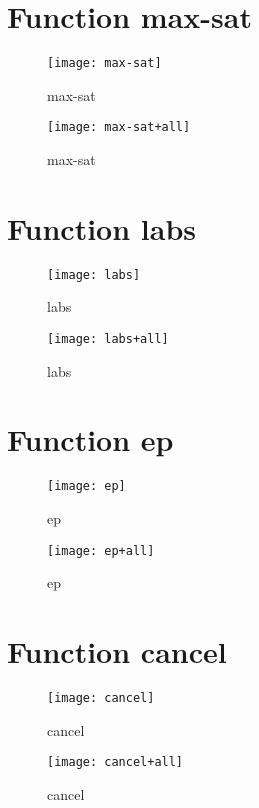 \section{Function max-sat}
\begin{center}

\end{center}
\begin{center}

\end{center}
\begin{figure}[h]
\centering
\texttt{[image: max-sat]}
\caption{max-sat}
\end{figure}
\begin{figure}[h]
\centering
\texttt{[image: max-sat+all]}
\caption{max-sat}
\end{figure}
\newpage
\section{Function labs}
\begin{center}

\end{center}
\begin{center}

\end{center}
\begin{figure}[h]
\centering
\texttt{[image: labs]}
\caption{labs}
\end{figure}
\begin{figure}[h]
\centering
\texttt{[image: labs+all]}
\caption{labs}
\end{figure}
\newpage
\section{Function ep}
\begin{center}

\end{center}
\begin{center}

\end{center}
\begin{figure}[h]
\centering
\texttt{[image: ep]}
\caption{ep}
\end{figure}
\begin{figure}[h]
\centering
\texttt{[image: ep+all]}
\caption{ep}
\end{figure}
\newpage
\section{Function cancel}
\begin{center}

\end{center}
\begin{center}

\end{center}
\begin{figure}[h]
\centering
\texttt{[image: cancel]}
\caption{cancel}
\end{figure}
\begin{figure}[h]
\centering
\texttt{[image: cancel+all]}
\caption{cancel}
\end{figure}
\newpage
